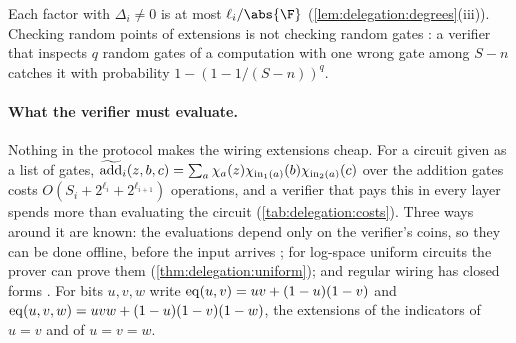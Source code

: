 \begin{refsection}
Each factor with $\Delta_i\ne0$ is at most $\ell_i/\abs{\F}$ (\cref{lem:delegation:degrees}(iii)). Checking random points of extensions is not checking random gates \parencite[\S4.6.5]{Thaler2022}: a verifier that inspects $q$ random gates of a computation with one wrong gate among $S-n$ catches it with probability $1-(1-1/(S-n))^q$.

\paragraph{What the verifier must evaluate.} Nothing in the protocol makes the wiring extensions cheap. For a circuit given as a list of gates, $\widetilde{\mathrm{add}}_i(z,b,c)=\sum_a\chi_a(z)\chi_{\mathrm{in}_1(a)}(b)\chi_{\mathrm{in}_2(a)}(c)$ over the addition gates costs $O(S_i+2^{\ell_i}+2^{\ell_{i+1}})$ operations, and a verifier that pays this in every layer spends more than evaluating the circuit (\cref{tab:delegation:costs}). Three ways around it are known: the evaluations depend only on the verifier's coins, so they can be done offline, before the input arrives \parencite{GoldwasserKalaiRothblum2015,Thaler2022}; for log-space uniform circuits the prover can prove them (\cref{thm:delegation:uniform}); and regular wiring has closed forms \parencite{CormodeMitzenmacherThaler2012,Thaler2013}. For bits $u,v,w$ write $\mathrm{eq}(u,v)=uv+(1-u)(1-v)$ and $\mathrm{eq}(u,v,w)=uvw+(1-u)(1-v)(1-w)$, the extensions of the indicators of $u=v$ and of $u=v=w$.



\end{refsection}
